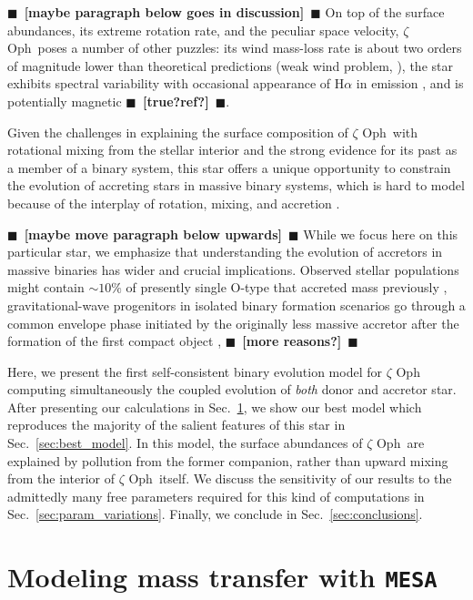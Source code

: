 \documentclass[twocolumn,twocolappendix,trackchanges]{aastex63}
\DeclareRobustCommand{\Secref}[1]{Sec.~\ref{#1}}
\newcommand{\zoph}{$\zeta$ Oph}
\newcommand{\todo}[1]{{\large $\blacksquare$~\textbf{\color{red}[#1]}}~$\blacksquare$}
\begin{document}
\todo{maybe paragraph below goes in discussion}
On top of the surface abundances, its extreme rotation rate, and the
peculiar space velocity, \zoph\ poses a number of other
puzzles: its wind mass-loss rate is about two orders of magnitude
lower than theoretical predictions (weak wind problem,
\citealt{marcolino:09}), the star exhibits spectral variability with
occasional appearance of H$\alpha$ in emission
\citep[e.g.,][]{walker:79}, and is potentially magnetic \todo{true?ref?}.

Given the challenges in explaining the surface composition of \zoph\
with rotational mixing from the stellar interior and the strong
evidence for its past as a member of a binary system, this star offers
a unique opportunity to constrain the evolution of accreting stars in
massive binary systems, which is hard to model because of the
interplay of rotation, mixing, and accretion
\citep[e.g.][]{hellings:83, hellings:84, braun:95}.

\todo{maybe move paragraph below upwards}
While we focus here on this particular star, we emphasize that
understanding the evolution of  accretors in massive binaries has
wider and crucial implications. Observed stellar populations might
contain $\sim10\%$ of presently single O-type that accreted mass
previously \citep{renzo:19walk}, gravitational-wave progenitors in
isolated binary formation scenarios go through a common envelope phase
initiated by the originally less massive accretor after the formation
of the first compact object \citep[e.g.,][]{belczynski:16nat, tauris:17,
  law-smith:20}, \todo{more reasons?}

Here, we present the first self-consistent binary evolution model for
$\zeta$ Oph computing simultaneously the coupled evolution of
\emph{both} donor
and accretor star. After presenting our calculations in
\Secref{sec:methods}, we show our best model which reproduces the
majority of the salient features of this star in
\Secref{sec:best_model}. In this model, the surface abundances of
\zoph\ are explained by pollution from the former companion, rather
than upward mixing from the interior of \zoph\ itself. We discuss the
sensitivity of our results to the admittedly many free parameters
required for this kind of computations in
\Secref{sec:param_variations}. Finally, we conclude in
\Secref{sec:conclusions}.

\section{Modeling mass transfer with \texttt{MESA}}
\label{sec:methods}
\end{document}
